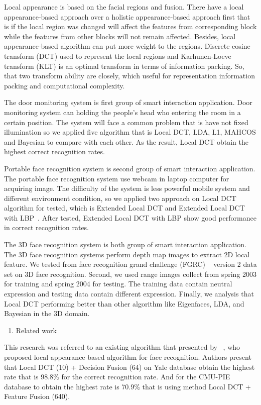 \documentclass[a4paper,12pt]{article}
\begin{document}
Local appearance is based on the facial regions and fusion. There have a local appearance-based approach over a holistic appearance-based approach first that is if the local region was changed will affect the features from corresponding block while the features from other blocks will not remain affected. Besides, local appearance-based algorithm can put more weight to the regions.
Discrete cosine transform (DCT) used to represent the local regions and Karhunen-Loeve transform (KLT) is an optimal transform in terms of information packing. So, that two transform ability are closely, which useful for representation information packing and computational complexity. 

The door monitoring system is first group of smart interaction application. 
Door monitoring system can holding the people’s head who entering the room in a certain position. The system will face a common problem that is have not fixed illumination so we applied five algorithm that is Local DCT, LDA, L1, MAHCOS and Bayesian to compare with each other. As the result, Local DCT obtain the highest correct recognition rates.

Portable face recognition system is second group of smart interaction application.  The portable face recognition system use webcam in laptop computer for acquiring image. The difficulty of the system is less powerful mobile system and different environment condition, so we applied two approach on Local DCT algorithm for tested, which is Extended Local DCT and Extended Local DCT with LBP~\cite{1717463}. After tested, Extended Local DCT with LBP show good performance in correct recognition rates.

The 3D face recognition system is both group of smart interaction application. The 3D face recognition systems perform depth map images to extract 2D local feature. We tested from face recognition grand challenge (FGRC) ~\cite{1467368} version 2 data set on 3D face recognition. Second, we used range images collect from spring 2003 for training and spring 2004 for testing. The training data contain neutral expression and testing data contain different expression. Finally, we analysis that Local DCT performing better than other algorithm like Eigenfaces, LDA, and Bayesian in the 3D domain.\\

\begin{enumerate}[{3.}]\bfseries
\item{\normalsize Related work} 
\end{enumerate}
This research was referred to an existing algorithm that presented by
~\cite{ekenel2005local}, who proposed local appearance based algorithm for face recognition. Authors present that Local DCT (10) + Decision Fusion (64) on Yale database obtain the highest rate that is 98.8\% for the correct recognition rate. And for the CMU-PIE database to obtain the highest rate is 70.9\% that is using method Local DCT + Feature Fusion (640).\\
\end{document}
